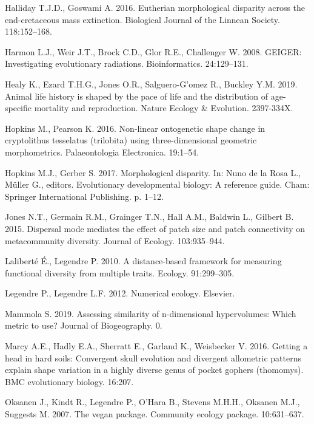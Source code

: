 \documentclass[]{article}
\begin{document}
\hypertarget{ref-halliday2015}{}
Halliday T.J.D., Goswami A. 2016. Eutherian morphological disparity
across the end-cretaceous mass extinction. Biological Journal of the
Linnean Society. 118:152--168.

\hypertarget{ref-geiger2008}{}
Harmon L.J., Weir J.T., Brock C.D., Glor R.E., Challenger W. 2008.
GEIGER: Investigating evolutionary radiations. Bioinformatics.
24:129--131.

\hypertarget{ref-healy2019}{}
Healy K., Ezard T.H.G., Jones O.R., Salguero-G'omez R., Buckley Y.M.
2019. Animal life history is shaped by the pace of life and the
distribution of age-specific mortality and reproduction. Nature Ecology
\& Evolution. 2397-334X.

\hypertarget{ref-hopkins2016}{}
Hopkins M., Pearson K. 2016. Non-linear ontogenetic shape change in
cryptolithus tesselatus (trilobita) using three-dimensional geometric
morphometrics. Palaeontologia Electronica. 19:1--54.

\hypertarget{ref-hopkins2017}{}
Hopkins M.J., Gerber S. 2017. Morphological disparity. In: Nuno de la
Rosa L., Müller G., editors. Evolutionary developmental biology: A
reference guide. Cham: Springer International Publishing. p. 1--12.

\hypertarget{ref-jones2015}{}
Jones N.T., Germain R.M., Grainger T.N., Hall A.M., Baldwin L., Gilbert
B. 2015. Dispersal mode mediates the effect of patch size and patch
connectivity on metacommunity diversity. Journal of Ecology.
103:935--944.

\hypertarget{ref-lalibertuxe92010}{}
Laliberté É., Legendre P. 2010. A distance-based framework for measuring
functional diversity from multiple traits. Ecology. 91:299--305.

\hypertarget{ref-legendre2012}{}
Legendre P., Legendre L.F. 2012. Numerical ecology. Elsevier.

\hypertarget{ref-mammola2019}{}
Mammola S. 2019. Assessing similarity of n-dimensional hypervolumes:
Which metric to use? Journal of Biogeography. 0.

\hypertarget{ref-marcy2016}{}
Marcy A.E., Hadly E.A., Sherratt E., Garland K., Weisbecker V. 2016.
Getting a head in hard soils: Convergent skull evolution and divergent
allometric patterns explain shape variation in a highly diverse genus of
pocket gophers (thomomys). BMC evolutionary biology. 16:207.

\hypertarget{ref-oksanen2007vegan}{}
Oksanen J., Kindt R., Legendre P., O'Hara B., Stevens M.H.H., Oksanen
M.J., Suggests M. 2007. The vegan package. Community ecology package.
10:631--637.
\end{document}
